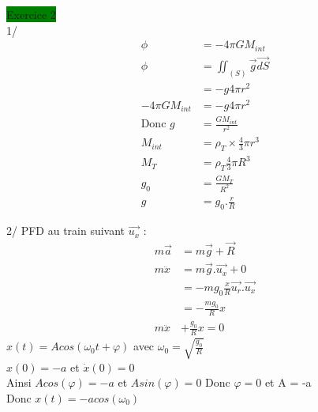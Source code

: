 \documentclass[a4paper]{article}
\begin{document}
 \noindent
\colorbox{green}{Exercice 2}\\
1/ 
\begin{align*}
    \phi &= -4\pi G M_{int}\\
    \phi &= \iint_{(S)} \vec{g} \vec{dS} \\
    &= -g4\pi r^2 \\
    -4\pi G M_{int} &= -g4\pi r^2\\
    \text{Donc } g &= \frac{GM_{int}}{r^2}\\
    M_{int} &= \rho_T \times \frac{4}{3}\pi r^3\\
    M_T &= \rho_T \frac{4}{3} \pi R^3\\
    g_0 &= \frac{GM_T}{R^2}\\
    g &= g_0 . \frac{r}{R}
\end{align*}

2/ PFD au train suivant \(\vec{u_x}\) : \begin{align*}
    m \vec{a} &= m\vec{g} + \vec{R}\\
    m\ddot{x} &= m\vec{g}.\vec{u_x} + 0\\
    &= -mg_0 \frac{x}{R}\vec{u_r}.\vec{u_x}\\
    &= -\frac{mg_0}{R}x\\
    m\ddot{x} &+ \frac{g_0}{R}x = 0
\end{align*}
\(x(t) = Acos(\omega_0 t + \varphi)\) avec \(\omega_0 = \sqrt{\frac{g_0}{R}}\)\\
\(x(0) = -a\) et \(\dot{x}(0) = 0\)\\
Ainsi \(Acos(\varphi) = -a\) et \(Asin(\varphi) = 0\) 
Donc \(\varphi = 0\) et A = -a\\
Donc \(x(t) = -acos(\omega_0)\)
\end{document}
